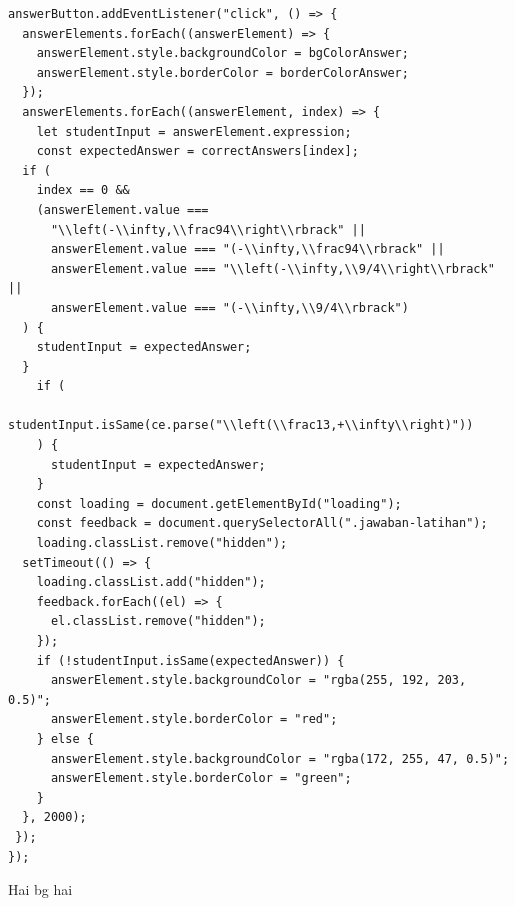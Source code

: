 \documentclass{file/KP-ITS}
\theoremstyle{definition}
\theoremstyle{definition}
\theoremstyle{plain}
\begin{document}
\begin{verbatim}
answerButton.addEventListener("click", () => {
  answerElements.forEach((answerElement) => {
    answerElement.style.backgroundColor = bgColorAnswer;
    answerElement.style.borderColor = borderColorAnswer;
  });
  answerElements.forEach((answerElement, index) => {
    let studentInput = answerElement.expression;
    const expectedAnswer = correctAnswers[index];
  if (
    index == 0 &&
    (answerElement.value ===
      "\\left(-\\infty,\\frac94\\right\\rbrack" ||
      answerElement.value === "(-\\infty,\\frac94\\rbrack" ||
      answerElement.value === "\\left(-\\infty,\\9/4\\right\\rbrack" ||
      answerElement.value === "(-\\infty,\\9/4\\rbrack")
  ) {
    studentInput = expectedAnswer;
  }
    if (
      studentInput.isSame(ce.parse("\\left(\\frac13,+\\infty\\right)"))
    ) {
      studentInput = expectedAnswer;
    }
    const loading = document.getElementById("loading");
    const feedback = document.querySelectorAll(".jawaban-latihan");
    loading.classList.remove("hidden");
  setTimeout(() => {
    loading.classList.add("hidden");
    feedback.forEach((el) => {
      el.classList.remove("hidden");
    });
    if (!studentInput.isSame(expectedAnswer)) {
      answerElement.style.backgroundColor = "rgba(255, 192, 203, 0.5)";
      answerElement.style.borderColor = "red";
    } else {
      answerElement.style.backgroundColor = "rgba(172, 255, 47, 0.5)";
      answerElement.style.borderColor = "green";
    }
  }, 2000);
 });
});
\end{verbatim}

\cleardoublepage
{}
Hai bg hai
\end{document}
